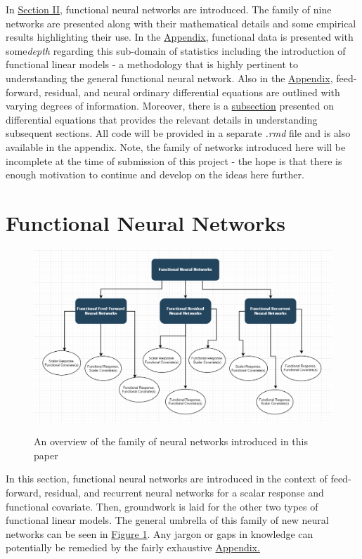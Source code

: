 \documentclass{article}
\begin{document}
\noindent In \hyperref[section:functionalNetworks]{Section II}, functional neural networks are introduced. The family of nine networks are presented along with their mathematical details and some empirical results highlighting their use. In the \hyperref[sec:appendix]{Appendix}, functional data is presented with some\textit{depth} regarding this sub-domain of statistics including the introduction of functional linear models - a methodology that is highly pertinent to understanding the general functional neural network. Also in the \hyperref[sec:nn]{Appendix}, feed-forward, residual, and neural ordinary differential equations are outlined with varying degrees of information. Moreover, there is a \hyperref[sec:de]{subsection} presented on differential equations that provides the relevant details in understanding subsequent sections. All code will be provided in a separate \textit{.rmd} file and is also available in the appendix. Note, the family of networks introduced here will be incomplete at the time of submission of this project - the hope is that there is enough motivation to continue and develop on the ideas here further.

\section{Functional Neural Networks}
\label{section:functionalNetworks}
\vspace{-7pt}
\begin{figure}[h!]
  \centering
  \includegraphics[scale = 0.6]{overview.png}
  \label{fig:family}
  \caption{An overview of the family of neural networks introduced in this paper}
\end{figure}
\vspace{-7pt}
\noindent In this section, functional neural networks are introduced in the context of feed-forward, residual, and recurrent neural networks for a scalar response and functional covariate. Then, groundwork is laid for the other two types of functional linear models. The general umbrella of this family of new neural networks can be seen in \hyperref[fig:family]{Figure 1}. Any jargon or gaps in knowledge can potentially be remedied by the fairly exhaustive \hyperref[sec:appendix]{Appendix.}
\end{document}
